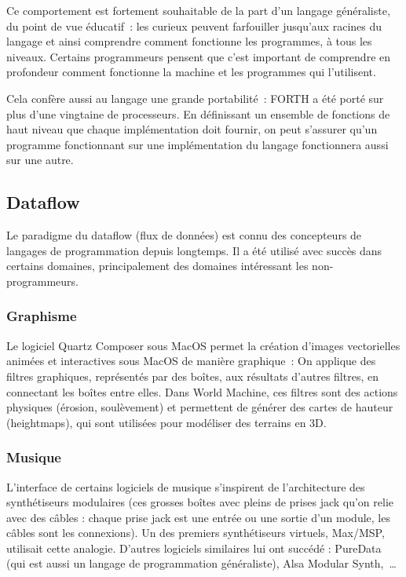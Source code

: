 \documentclass{article}
\begin{document}
Ce comportement est fortement souhaitable de la part d'un langage généraliste, du point de vue éducatif~: les curieux peuvent farfouiller
jusqu'aux racines du langage et ainsi comprendre comment fonctionne les programmes, à tous les niveaux. Certains programmeurs pensent que
c'est important de comprendre en profondeur comment fonctionne la machine et les programmes qui l'utilisent\cite{coders-at-work}.

Cela confère aussi au langage une grande portabilité~: FORTH a été porté sur plus d'une vingtaine de processeurs\cite{forth-history}. En définissant un ensemble
de fonctions de haut niveau que chaque implémentation doit fournir, on peut s'assurer qu'un programme fonctionnant sur une implémentation du
langage fonctionnera aussi sur une autre.

\subsection{Dataflow}

Le paradigme du dataflow\cite{vanroy-paradigms} (flux de données) est connu des concepteurs de langages de programmation depuis longtemps. Il a été utilisé avec
succès dans certains domaines, principalement des domaines intéressant les non-programmeurs.

\subsubsection{Graphisme}

Le logiciel Quartz Composer sous MacOS permet la création d'images vectorielles animées et interactives sous MacOS de manière graphique~: On
applique des filtres graphiques, représentés par des boîtes, aux résultats d'autres filtres, en connectant les boîtes entre elles. Dans
World Machine, ces filtres sont des actions physiques (érosion, soulèvement) et permettent de générer des cartes de hauteur (heightmaps),
qui sont utilisées pour modéliser des terrains en 3D.

\subsubsection{Musique}

L'interface de certains logiciels de musique s'inspirent de l'architecture des synthétiseurs modulaires\cite{modular-synth} (ces grosses
boîtes avec pleins de prises jack qu'on relie avec des câbles : chaque prise jack est une entrée ou une sortie d'un module, les câbles sont
les connexions). Un des premiers synthétiseurs virtuels, Max/MSP, utilisait cette analogie. D'autres logiciels similaires lui ont succédé :
PureData (qui est aussi un langage de programmation généraliste), Alsa Modular Synth,~\dots
\end{document}
